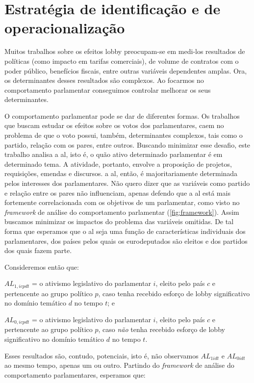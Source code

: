 \section{Estratégia de identificação e de operacionalização}

Muitos trabalhos sobre os efeitos lobby preocupam-se em medi-los resultados de políticas (como impacto em tarifas comerciais), de volume de contratos com o poder público, benefícios fiscais, entre outras variáveis dependentes amplas. Ora, os determinantes desses resultados são complexos. Ao focarmos no comportamento parlamentar conseguimos controlar melhorar os seus determinantes.

O comportamento parlamentar pode se dar de diferentes formas. Os trabalhos que buscam estudar os efeitos sobre os votos dos parlamentares, caem no problema de que o voto possui, também, determinantes complexos, tais como o partido, relação com os pares, entre outros. Buscando minimizar esse desafio, este trabalho analisa a \acrfull{al}, isto é, o quão ativo determinado parlamentar é em determinado tema. A atividade, portanto, envolve a proposição de projetos, requisições, emendas e discursos. a \acrshort{al}, então, é majoritariamente determinada pelos interesses dos parlamentares. Não quero dizer que as variáveis como partido e relação entre os pares não influenciam, apenas defendo que a \acrshort{al} está mais fortemente correlacionada com os objetivos de um parlamentar, como visto no \textit{framework} de análise do comportamento parlamentar (\ref{fig:framework}). Assim buscamos minimizar os impactos do problema das variáveis omitidas. De tal forma que esperamos que o \acrshort{al} seja uma função de características individuais dos parlamentares, dos países pelos quais os eurodeputados são eleitos e dos partidos dos quais fazem parte. 

Consideremos então que:
\begin{center}
$AL_{1,icpdt}$ = o ativismo legislativo do parlamentar $i$, eleito pelo país $c$ e pertencente ao grupo político $p$, caso tenha recebido esforço de lobby significativo no domínio temático $d$ no tempo $t$; e

$AL_{0,icpdt}$ = o ativismo legislativo do parlamentar $i$, eleito pelo país $c$ e pertencente ao grupo político $p$, caso \emph{não} tenha recebido esforço de lobby significativo no domínio temático $d$ no tempo $t$.
\end{center}

Esses resultados são, contudo, potenciais, isto é, não observamos $AL_{1idt}$ e $AL_{0idt}$ ao mesmo tempo, apenas um ou outro. Partindo do \textit{framework} de análise do comportamento parlamentares, esperamos que:

